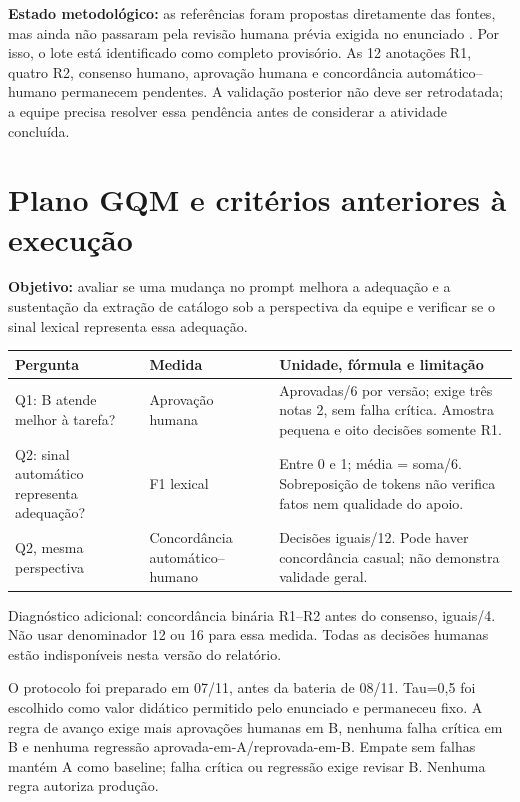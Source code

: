 \documentclass[a4paper,12pt]{article}
\begin{document}
\textbf{Estado metodológico:} as referências foram propostas diretamente das fontes, mas ainda não passaram pela revisão humana prévia exigida no enunciado \cite{enunciado}. Por isso, o lote está identificado como completo provisório. As 12 anotações R1, quatro R2, consenso humano, aprovação humana e concordância automático--humano permanecem pendentes. A validação posterior não deve ser retrodatada; a equipe precisa resolver essa pendência antes de considerar a atividade concluída.

\section{Plano GQM e critérios anteriores à execução}
\textbf{Objetivo:} avaliar se uma mudança no prompt melhora a adequação e a sustentação da extração de catálogo sob a perspectiva da equipe e verificar se o sinal lexical representa essa adequação.

\begingroup\small\setlength{\tabcolsep}{4pt}
\begin{longtable}{@{}p{3.3cm}p{4.3cm}p{6.8cm}@{}}\toprule
Pergunta & Medida & Unidade, fórmula e limitação \\\midrule
Q1: B atende melhor à tarefa? & Aprovação humana & Aprovadas/6 por versão; exige três notas 2, sem falha crítica. Amostra pequena e oito decisões somente R1. \\
Q2: sinal automático representa adequação? & F1 lexical & Entre 0 e 1; média = soma/6. Sobreposição de tokens não verifica fatos nem qualidade do apoio. \\
Q2, mesma perspectiva & Concordância automático--humano & Decisões iguais/12. Pode haver concordância casual; não demonstra validade geral. \\\bottomrule
\end{longtable}\endgroup
Diagnóstico adicional: concordância binária R1--R2 antes do consenso, iguais/4. Não usar denominador 12 ou 16 para essa medida. Todas as decisões humanas estão indisponíveis nesta versão do relatório.

O protocolo foi preparado em 07/11, antes da bateria de 08/11. Tau=0,5 foi escolhido como valor didático permitido pelo enunciado e permaneceu fixo. A regra de avanço exige mais aprovações humanas em B, nenhuma falha crítica em B e nenhuma regressão aprovada-em-A/reprovada-em-B. Empate sem falhas mantém A como baseline; falha crítica ou regressão exige revisar B. Nenhuma regra autoriza produção.
\end{document}

